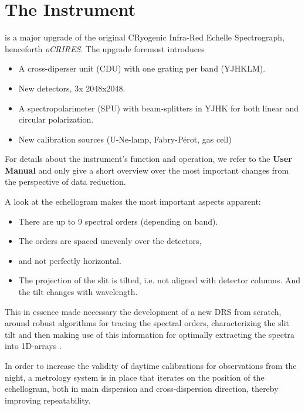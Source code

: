 \section{The Instrument}
\label{sec:instrument}

\instrument{} is a major upgrade of the original CRyogenic Infra-Red Echelle
Spectrograph, henceforth \textit{oCRIRES}. The upgrade foremost introduces
\begin{itemize}
  \item A cross-diperser unit (CDU) with one grating per band (YJHKLM).
  \item New detectors, 3x 2048x2048.
  \item A spectropolarimeter (SPU) with beam-splitters in YJHK for both linear
        and circular polarization.
  \item New calibration sources (U-Ne-lamp, Fabry-Pérot, gas cell)
\end{itemize}

For details about the instrument's function and operation, we refer to the
\textbf{User Manual} \cite{CIRESMAN} and only give a short overview over the
most important changes from the perspective of data reduction.

A look at the echellogram makes the most important aspects apparent:

\begin{itemize}
  \item There are up to 9 spectral orders (depending on band).
  \item The orders are spaced unevenly over the detectors,
  \item and not perfectly horizontal.
  \item The projection of the slit is tilted, i.e. not aligned with detector
    columns. And the tilt changes with wavelength.
\end{itemize}

This in essence made necessary the development of a new DRS from scratch, around
robust algorithms for tracing the spectral orders, characterizing the slit tilt
and then making use of this information for optimally extracting the spectra
into 1D-arrays \cite{2021A&A...646A..32P}.

In order to increase the validity of daytime calibrations for observations
from the night, a metrology system is in place that iterates on the position
of the echellogram, both in main dispersion and cross-dispersion direction, thereby
improving repeatability.

